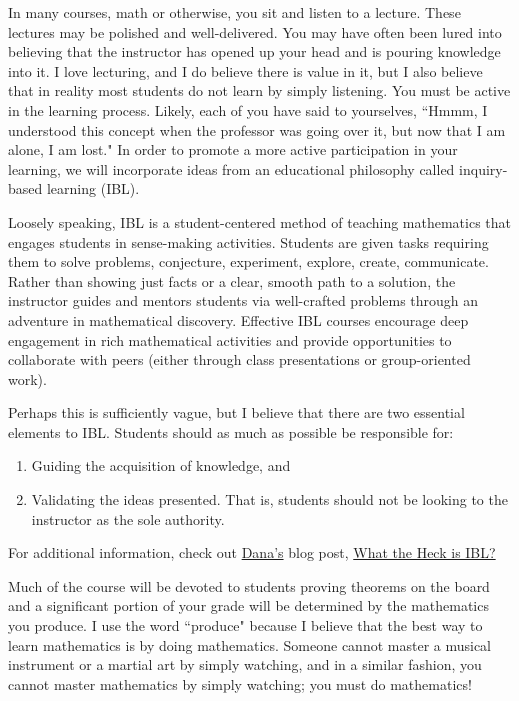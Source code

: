 In many courses, math or otherwise, you sit and listen to a lecture. These lectures may be polished and well-delivered. You may have often been lured into believing that the instructor has opened up your head and is pouring knowledge into it. I  love lecturing, and I do believe there is value in it, but I also believe that in reality most students do not learn by simply listening. You must be active in the learning process. Likely, each of you have said to yourselves, ``Hmmm, I understood this concept when the professor was going over it, but now that I am alone, I am lost." In order to promote a more active participation in your learning, we will incorporate ideas from an educational philosophy called inquiry-based learning (IBL).

Loosely speaking, IBL is a student-centered method of teaching mathematics that engages students in sense-making activities.  Students are given tasks requiring them to solve problems, conjecture, experiment, explore, create, communicate.  Rather than showing just facts or a clear, smooth path to a solution, the instructor guides and mentors students via well-crafted problems through an adventure in mathematical discovery.  Effective IBL courses encourage deep engagement in rich mathematical activities and provide opportunities to collaborate with peers (either through class presentations or group-oriented work).

Perhaps this is sufficiently vague, but I believe that there are two essential elements to IBL.  Students should as much as possible be responsible for:
\begin{enumerate}
\item Guiding the acquisition of knowledge, and
\item Validating the ideas presented.  That is, students should not be looking to the instructor as the sole authority.
\end{enumerate}
\noindent For additional information, check out \href{https://danaernst.com}{Dana's} blog post, \href{http://maamathedmatters.blogspot.com/2013/05/what-heck-is-ibl.html}{What the Heck is IBL?}

Much of the course will be devoted to students proving theorems on the board and a significant portion of your grade will be determined by the  mathematics you produce. I use the word ``produce" because I believe that the best way to learn mathematics is by doing mathematics. Someone cannot master a musical instrument or a martial art by simply watching, and in a similar fashion, you cannot master mathematics by simply watching; you must do mathematics!

